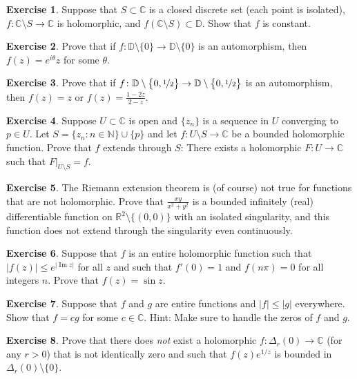 \documentclass[12pt,openany]{book}
\renewcommand{\Im}{\operatorname{Im}}
\newcommand{\sabs}[1]{\lvert {#1} \rvert}
\newcommand{\C}{{\mathbb{C}}}
\newcommand{\R}{{\mathbb{R}}}
\newcommand{\N}{{\mathbb{N}}}
\newcommand{\D}{{\mathbb{D}}}
\theoremstyle{plain}
\theoremstyle{remark}
\theoremstyle{definition}
\newenvironment{exbox}{%
    \def\FrameCommand{\vrule width 1pt \relax\hspace{10pt}}%
    \MakeFramed{\advance\hsize-\width\FrameRestore}%
}{%
    \endMakeFramed
}
\theoremstyle{exercise}
\newtheorem{exercise}{Exercise}[section]
\theoremstyle{example}
\begin{document}
\begin{exbox}
\begin{exercise}
Suppose that $S \subset \C$ is a closed discrete set (each point is isolated),
$f \colon \C \setminus S \to \C$ is holomorphic,
and $f(\C \setminus S) \subset \D$.
Show that $f$ is constant.
\end{exercise}

\begin{exercise}
Prove that if $f \colon \D \setminus \{ 0 \} \to \D \setminus \{ 0 \}$
is an automorphism, then $f(z) = e^{i\theta} z$ for some $\theta$.
\end{exercise}

\begin{exercise}
Prove that if
$f \colon \D \setminus \bigl\{ 0, \nicefrac{1}{2} \bigr\} \to \D \setminus
\bigl\{ 0 , \nicefrac{1}{2} \bigr\}$
is an automorphism, then $f(z) = z$ or $f(z) = \frac{1-2z}{2-z}$.
\end{exercise}

\begin{exercise}
Suppose $U \subset \C$ is open and
$\{ z_n \}$ is a sequence in $U$ converging to $p \in U$.
Let $S = \{ z_n : n \in \N \} \cup \{ p \}$ and let
$f \colon U \setminus S \to \C$ be a bounded holomorphic function.
Prove that $f$ extends through $S$:  There exists a holomorphic
$F \colon U \to \C$ such that $F|_{U \setminus S} = f$.
\end{exercise}

\begin{exercise}
The Riemann extension theorem is (of course) not true for functions that are
not holomorphic.  Prove that $\frac{xy}{x^2+y^2}$ is a bounded infinitely 
(real) differentiable function
on $\R^2 \setminus \{ (0,0) \}$ with an isolated singularity, and this
function does not
extend through the singularity even continuously.
\end{exercise}

\begin{exercise}
Suppose that $f$ is an entire holomorphic function such that
$\sabs{f(z)} \leq e^{\sabs{\Im z}}$ for all $z$ and such that
$f'(0) =1$ and $f(n\pi) = 0$ for all integers $n$.
Prove that $f(z) = \sin z$.
\end{exercise}

\begin{exercise}
Suppose that $f$ and $g$ are entire functions and $\sabs{f} \leq \sabs{g}$
everywhere.  Show that $f = c g$ for some $c \in \C$.
Hint: Make sure to handle the zeros of $f$ and $g$.
\end{exercise}

\begin{exercise}
Prove that there does \emph{not} exist a holomorphic
$f \colon \Delta_r(0) \to \C$ (for any $r > 0$)
that is not identically zero and
such that
$f(z) e^{1/z}$ is bounded in $\Delta_r(0) \setminus \{ 0 \}$.
\end{exercise}
\end{exbox}
\end{document}
